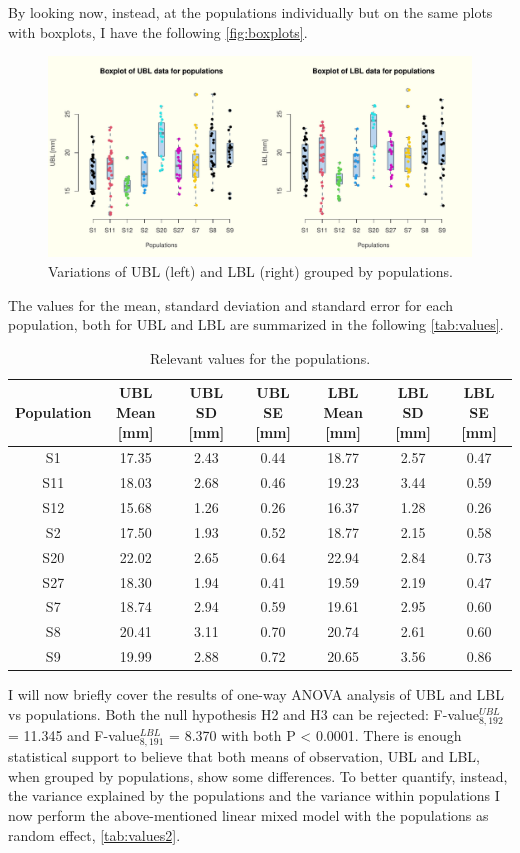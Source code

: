 \documentclass{article}
\begin{document}
By looking now, instead, at the populations individually but on the same plots with boxplots, I have the following \autoref{fig:boxplots}.
\begin{figure}[H]
     \centering
  \includegraphics[scale=0.65]{ubl_lbl-popu.pdf}
     \caption{Variations of UBL (left) and LBL (right) grouped by populations.}
     \label{fig:boxplots}
\end{figure}

The values for the mean, standard deviation and standard error for each population, both for UBL and LBL are summarized in the following \autoref{tab:values}.

\begin{table}[H]
\centering
\caption{Relevant values for the populations.}
\begin{tabular}{c c c c c c c } 
 \hline
Population & UBL Mean [mm] & UBL SD [mm] & UBL SE [mm] & LBL Mean [mm] & LBL SD [mm] & LBL SE [mm]    \\  
 \hline
 S1 &17.35&2.43&0.44&18.77&2.57&0.47 \\
 S11 &18.03&2.68&0.46&19.23&3.44&0.59 \\
 S12 &15.68&1.26&0.26&16.37&1.28&0.26 \\
 S2 &17.50&1.93&0.52&18.77&2.15&0.58 \\
 S20 &22.02&2.65&0.64&22.94&2.84&0.73 \\
 S27 &18.30&1.94&0.41&19.59&2.19&0.47 \\
 S7 &18.74&2.94&0.59&19.61&2.95&0.60 \\
 S8 &20.41&3.11&0.70&20.74&2.61&0.60 \\
 S9 &19.99&2.88&0.72&20.65&3.56&0.86 \\
 \hline
\end{tabular}
\label{tab:values}
\end{table}

I will now briefly cover the results of one-way ANOVA analysis of UBL and LBL vs populations.
Both the null hypothesis H2 and H3 can be rejected: F-value$_{8, 192}^{UBL}$ = 11.345 and F-value$_{8, 191}^{LBL}$ = 8.370 with both P < 0.0001. There is enough statistical support to believe that both means of observation, UBL and LBL, when grouped by populations, show some differences. To better quantify, instead, the variance explained by the populations and the variance within populations I now perform the above-mentioned linear mixed model with the populations as random effect, \autoref{tab:values2}.
\end{document}
